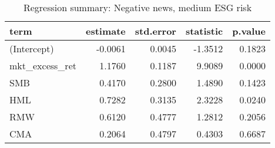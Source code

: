 \begin{table}[H]
\caption{Regression summary: Negative news, medium ESG risk}
\centering
\begin{tabular}{lrrrr}
  \hline
term & estimate & std.error & statistic & p.value \\ 
  \hline
(Intercept) & -0.0061 & 0.0045 & -1.3512 & 0.1823 \\ 
  mkt\_excess\_ret & 1.1760 & 0.1187 & 9.9089 & 0.0000 \\ 
  SMB & 0.4170 & 0.2800 & 1.4890 & 0.1423 \\ 
  HML & 0.7282 & 0.3135 & 2.3228 & 0.0240 \\ 
  RMW & 0.6120 & 0.4777 & 1.2812 & 0.2056 \\ 
  CMA & 0.2064 & 0.4797 & 0.4303 & 0.6687 \\ 
   \hline
\end{tabular}
\label{tab: summary_neg_ESG_M}
\end{table}

